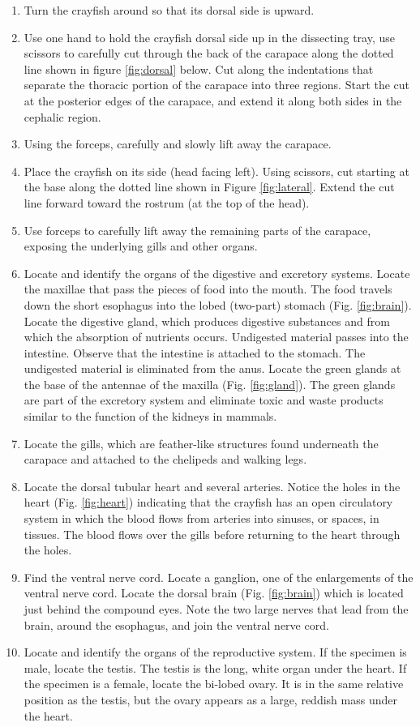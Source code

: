 \documentclass[]{book}
\begin{document}
\begin{enumerate}
\item
  Turn the crayfish around so that its dorsal side is upward.
\item
  Use one hand to hold the crayfish dorsal side up in the dissecting tray, use scissors to carefully cut through the back of the carapace along the dotted line shown in figure \ref{fig:dorsal} below. Cut along the indentations that separate the thoracic portion of the carapace into three regions. Start the cut at the posterior edges of the carapace, and extend it along both sides in the cephalic region.
\item
  Using the forceps, carefully and slowly lift away the carapace.
\item
  Place the crayfish on its side (head facing left). Using scissors, cut starting at the base along the dotted line shown in Figure \ref{fig:lateral}. Extend the cut line forward toward the rostrum (at the top of the head).
\item
  Use forceps to carefully lift away the remaining parts of the carapace, exposing the underlying gills and other organs.
\item
  Locate and identify the organs of the digestive and excretory systems. Locate the maxillae that pass the pieces of food into the mouth. The food travels down the short esophagus into the lobed (two-part) stomach (Fig. \ref{fig:brain}). Locate the digestive gland, which produces digestive substances and from which the absorption of nutrients occurs. Undigested material passes into the intestine. Observe that the intestine is attached to the stomach. The undigested material is eliminated from the anus. Locate the green glands at the base of the antennae of the maxilla (Fig. \ref{fig:gland}). The green glands are part of the excretory system and eliminate toxic and waste products similar to the function of the kidneys in mammals.
\item
  Locate the gills, which are feather-like structures found underneath the carapace and attached to the chelipeds and walking legs.
\item
  Locate the dorsal tubular heart and several arteries. Notice the holes in the heart (Fig. \ref{fig:heart}) indicating that the crayfish has an open circulatory system in which the blood flows from arteries into sinuses, or spaces, in tissues. The blood flows over the gills before returning to the heart through the holes.
\item
  Find the ventral nerve cord. Locate a ganglion, one of the enlargements of the ventral nerve cord. Locate the dorsal brain (Fig. \ref{fig:brain}) which is located just behind the compound eyes. Note the two large nerves that lead from the brain, around the esophagus, and join the ventral nerve cord.
\item
  Locate and identify the organs of the reproductive system. If the specimen is male, locate the testis. The testis is the long, white organ under the heart. If the specimen is a female, locate the bi-lobed ovary. It is in the same relative position as the testis, but the ovary appears as a large, reddish mass under the heart.
\end{enumerate}
\end{document}

